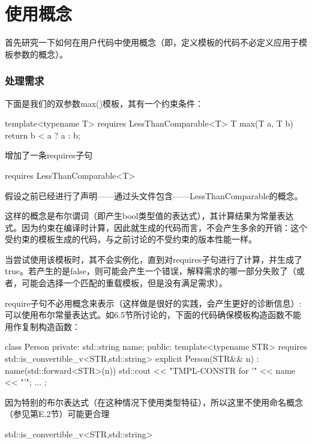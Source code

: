 \section{使用概念}

首先研究一下如何在用户代码中使用概念（即，定义模板的代码不必定义应用于模板参数的概念）。

\subsubsection{处理需求}

下面是我们的双参数max()模板，其有一个约束条件：

\begin{cpp}
template<typename T> requires LessThanComparable<T>
T max(T a, T b) {
	return b < a ? a : b;
}
\end{cpp}

增加了一条requires子句

\begin{cpp}
requires LessThanComparable<T>
\end{cpp}

假设之前已经进行了声明——通过头文件包含——LessThanComparable的概念。

这样的概念是布尔谓词（即产生bool类型值的表达式），其计算结果为常量表达式。因为约束在编译时计算，因此就生成的代码而言，不会产生多余的开销：这个受约束的模板生成的代码，与之前讨论的不受约束的版本性能一样。

当尝试使用该模板时，其不会实例化，直到对requires子句进行了计算，并生成了true。若产生的是false，则可能会产生一个错误，解释需求的哪一部分失败了（或者，可能会选择一个匹配的重载模板，但是没有满足需求）。

require子句不必用概念来表示（这样做是很好的实践，会产生更好的诊断信息）:可以使用布尔常量表达式。如6.5节所讨论的，下面的代码确保模板构造函数不能用作复制构造函数：

\begin{cpp}
class Person {
	private:
	std::string name;
	public:
	template<typename STR>
	requires std::is_convertible_v<STR,std::string>
	explicit Person(STR&& n)
	: name(std::forward<STR>(n)) {
		std::cout << "TMPL-CONSTR for '" << name << "'\n";
	}
	...
};
\end{cpp}

因为特别的布尔表达式（在这种情况下使用类型特征），所以这里不使用命名概念（参见第E.2节）可能更合理

\begin{cpp}
std::is_convertible_v<STR,std::string>
\end{cpp}

